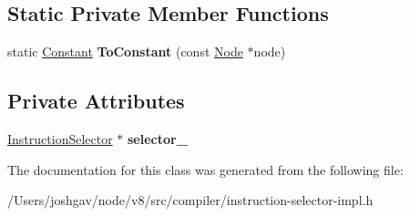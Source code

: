 \subsection*{Static Private Member Functions}
\begin{DoxyCompactItemize}
\item 
static \hyperlink{classv8_1_1internal_1_1compiler_1_1_constant}{Constant} {\bfseries To\+Constant} (const \hyperlink{classv8_1_1internal_1_1compiler_1_1_node}{Node} $\ast$node)\hypertarget{classv8_1_1internal_1_1compiler_1_1_operand_generator_a144b853071d75ac688cd0ad2520df430}{}\label{classv8_1_1internal_1_1compiler_1_1_operand_generator_a144b853071d75ac688cd0ad2520df430}

\end{DoxyCompactItemize}
\subsection*{Private Attributes}
\begin{DoxyCompactItemize}
\item 
\hyperlink{classv8_1_1internal_1_1compiler_1_1_instruction_selector}{Instruction\+Selector} $\ast$ {\bfseries selector\+\_\+}\hypertarget{classv8_1_1internal_1_1compiler_1_1_operand_generator_acf5d413ee2acb9e051bf6983d0c72d03}{}\label{classv8_1_1internal_1_1compiler_1_1_operand_generator_acf5d413ee2acb9e051bf6983d0c72d03}

\end{DoxyCompactItemize}


The documentation for this class was generated from the following file\+:\begin{DoxyCompactItemize}
\item 
/\+Users/joshgav/node/v8/src/compiler/instruction-\/selector-\/impl.\+h\end{DoxyCompactItemize}

